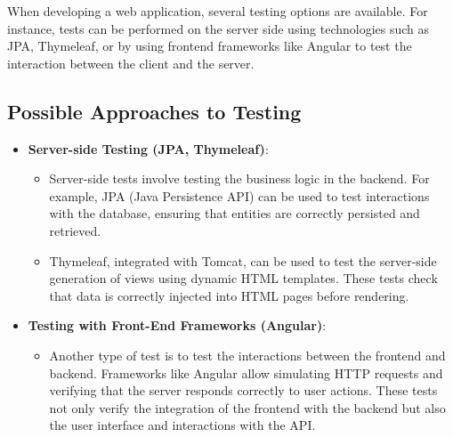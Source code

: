 \documentclass[a4paper,12pt]{article}
\begin{document}
When developing a web application, several testing options are available. For instance, tests can be performed on the server side using technologies such as JPA, Thymeleaf, or by using frontend frameworks like Angular to test the interaction between the client and the server.

\subsection{Possible Approaches to Testing}
\begin{itemize}
    \item \textbf{Server-side Testing (JPA, Thymeleaf)}: 
    \begin{itemize}
        \item Server-side tests involve testing the business logic in the backend. For example, JPA (Java Persistence API) can be used to test interactions with the database, ensuring that entities are correctly persisted and retrieved. 
        \item Thymeleaf, integrated with Tomcat, can be used to test the server-side generation of views using dynamic HTML templates. These tests check that data is correctly injected into HTML pages before rendering.
    \end{itemize}
    
    \item \textbf{Testing with Front-End Frameworks (Angular)}: 
    \begin{itemize}
        \item Another type of test is to test the interactions between the frontend and backend. Frameworks like Angular allow simulating HTTP requests and verifying that the server responds correctly to user actions. These tests not only verify the integration of the frontend with the backend but also the user interface and interactions with the API.
    \end{itemize}
\end{itemize}
\end{document}
